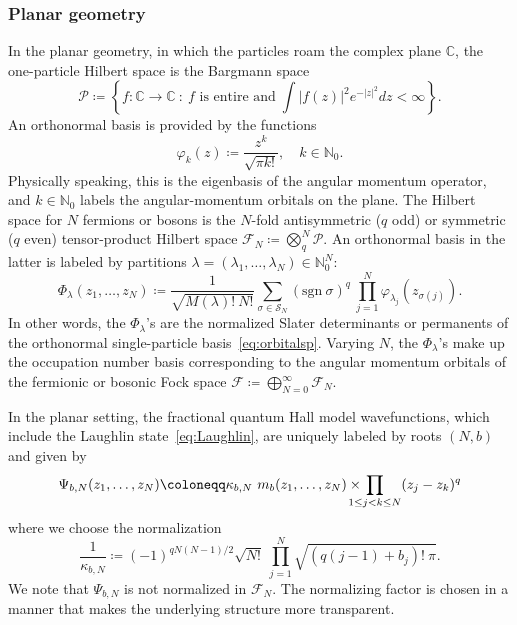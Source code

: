 \documentclass[letterpaper, DIV=17]{scrartcl}
\numberwithin{equation}{section}
\theoremstyle{definition}
\begin{document}
\subsubsection{Planar geometry}
In the planar geometry, in which the particles roam the complex plane $ \mathbb{C} $, the one-particle Hilbert space is the Bargmann space 
$$ \mathcal{P} \coloneqq \left\{ f:\mathbb{C} \to \mathbb{C} \ : \ \mbox{$f $ is entire and} \; \int |f(z)|^2 e^{- |z|^2} dz < \infty \right\} . $$
An orthonormal basis is provided by the functions
\begin{equation}\label{eq:orbitalsp}
\varphi_k(z) \coloneqq \frac{z^k}{\sqrt{\pi k!} } ,  \quad k \in \mathbb{N}_0 .
\end{equation}
Physically speaking, this is the eigenbasis of the angular momentum operator, and $ k \in \mathbb{N}_0 $ labels the angular-momentum orbitals on the plane. 
The Hilbert space for $ N $ fermions or bosons is the $ N $-fold antisymmetric ($q$ odd) or symmetric ($q$ even) tensor-product Hilbert space $ \mathcal{F}_N \coloneqq \bigotimes_{q}^N \mathcal{P} $. An orthonormal basis in the latter is labeled by partitions $ \lambda = (\lambda_1 , \dots , \lambda_N) \in \mathbb{N}_0^N$:
\begin{equation}\label{eq:Slater}
\Phi_\lambda(z_1,\dots, z_N) \coloneqq \frac{1}{\sqrt{M(\lambda)! \ N!}} \sum_{\sigma\in \mathcal{S}_N} \left(\textrm{sgn}\ \sigma\right)^q \ \prod_{j=1}^N \varphi_{\lambda_j}(z_{\sigma(j)})  . 
\end{equation} 
In other words, the $ \Phi_\lambda $'s are the normalized Slater determinants or permanents of the orthonormal single-particle basis~\eqref{eq:orbitalsp}.
Varying $ N $, the $ \Phi_\lambda $'s make up the occupation number basis corresponding to the angular momentum orbitals of the fermionic or bosonic Fock space $ \mathcal{F} \coloneqq \bigoplus_{N=0}^\infty  \mathcal{F}_N $.



In the planar setting, the fractional quantum Hall model wavefunctions, which include the Laughlin state~\eqref{eq:Laughlin}, are uniquely labeled by roots $ (N,b) $ and given by
\begin{align}\label{def:WF}
 \Psi_{b,N}(z_1,\dots , z_N)  \coloneqq \kappa_{b,N} \ m_{b}(z_1, \dots, z_N) \times \mkern-20mu \prod_{1\leq j<k\leq N} (z_j-z_k)^q
 \end{align} 
 where we choose the normalization
\begin{equation}\label{eq:kappanorm}
	\frac{1}{\kappa_{b,N}} \coloneqq(-1)^{qN(N-1)/2}  \sqrt{N!}  \ \prod_{j=1}^N \sqrt{(q(j-1)+b_j)! \ \pi } . 
\end{equation}
We note that $\Psi_{b,N}$ is not normalized in $\mathcal{F}_N$. The normalizing factor is chosen in a manner that makes the underlying structure more transparent.\\
\end{document}
